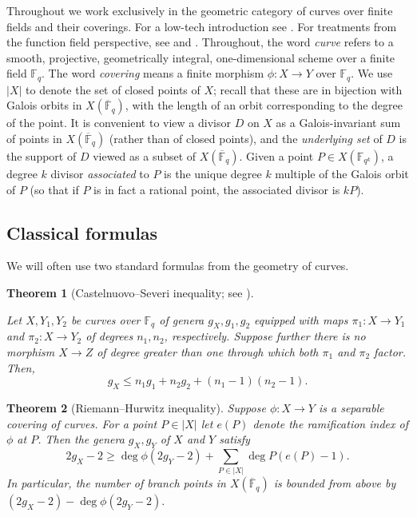\documentclass[11pt]{amsart}
\newcommand{\F}{\mathbb{F}}
\newcommand{\Fbar}{{\overline{\F}}}
\newtheorem{theorem}{Theorem}[section]
\theoremstyle{definition}
\theoremstyle{remark}
\begin{document}
Throughout we work exclusively in the geometric category of curves over finite fields and their coverings. For a low-tech introduction see \cite{FultonCurves}. For treatments from the function field perspective, see \cite{StichtenothBook} and \cite{RosenBook}.
Throughout, the word \emph{curve} refers to a smooth, projective, geometrically integral, one-dimensional scheme over a finite field $\F_q$. The word \emph{covering} means a finite morphism $\phi\colon X \to Y$ over $\F_q$.  We use $|X|$ to denote the set of closed points of $X$; recall that these are in bijection with Galois orbits in $X(\Fbar_q)$, with the length of an orbit corresponding to the degree of the point. It is convenient to view a divisor $D$ on $X$ as a Galois-invariant sum of points in $X(\Fbar_q)$ (rather than of closed points), and the \emph{underlying set} of $D$ is the support of $D$ viewed as a subset of $X(\Fbar_q)$. Given a point $P \in X(\F_{q^k})$, a degree $k$ divisor \emph{associated} to $P$ is the unique degree $k$ multiple of the Galois orbit of $P$ (so that if $P$ is in fact a rational point, the associated divisor is $kP$).

\subsection{Classical formulas}
We will often use two standard formulas from the geometry of curves.

\begin{theorem}[Castelnuovo--Severi inequality; see \cite{kani1984castelnuovo}]\label{thm:CS}

Let $X,Y_1,Y_2$ be curves over $\mathbb{F}_q$ of genera $g_X,g_1,g_2$ equipped with maps $\pi_1: X \to Y_1$ and $\pi_2: X \to Y_2$ of degrees $n_1, n_2$, respectively. Suppose further there is no morphism $X \to Z$ of degree greater than one through which both $\pi_1$ and $\pi_2$ factor. Then, 
\begin{equation*}
    g_X \leq n_1g_1 + n_2g_2 + (n_1-1)(n_2-1).
\end{equation*}
\end{theorem}

\begin{theorem}[Riemann--Hurwitz inequality]\label{thm:RH}
    Suppose $\phi: X \to Y$ is a separable covering of curves. For a point $P \in |X|$ let $e(P)$ denote the ramification index of $\phi$ at $P$. Then the genera $g_X, g_Y$ of $X$ and $Y$ satisfy 
    \[2g_X-2 \geqslant \deg \phi(2g_Y-2)+\sum_{P \in |X|}\deg P(e(P)-1).\]
    In particular, the number of branch points in $X(\Fbar_q)$ is bounded from above by $(2g_X-2)-\deg \phi (2g_Y-2).$
\end{theorem}
\end{document}

